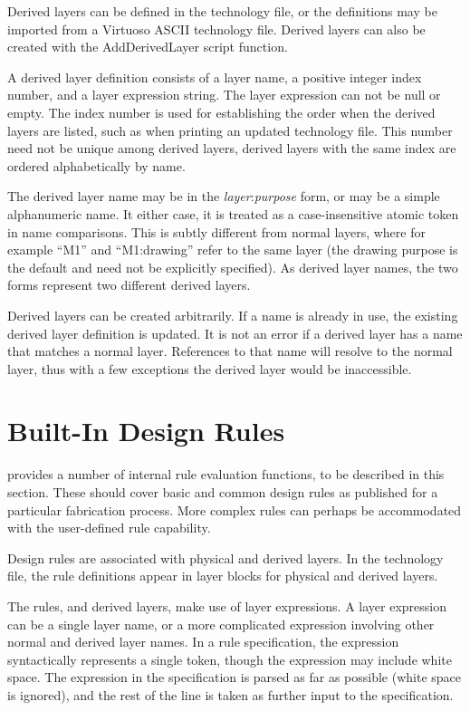 Derived layers can be defined in the technology file, or the
definitions may be imported from a Virtuoso ASCII technology file. 
Derived layers can also be created with the {\vt AddDerivedLayer}
script function.

A derived layer definition consists of a layer name, a positive
integer index number, and a layer expression string.  The layer
expression can not be null or empty.  The index number is used for
establishing the order when the derived layers are listed, such as
when printing an updated technology file.  This number need not be
unique among derived layers, derived layers with the same index are
ordered alphabetically by name.

The derived layer name may be in the {\it layer\/}:{\it purpose} form,
or may be a simple alphanumeric name.  It either case, it is treated
as a case-insensitive atomic token in name comparisons.  This is
subtly different from normal layers, where for example ``{\vt M1}''
and ``{\vt M1:drawing}'' refer to the same {\Xic} layer (the {\vt
drawing} purpose is the default and need not be explicitly specified). 
As derived layer names, the two forms represent two different derived
layers.

Derived layers can be created arbitrarily.  If a name is already in
use, the existing derived layer definition is updated.  It is not an
error if a derived layer has a name that matches a normal layer. 
References to that name will resolve to the normal layer, thus with a
few exceptions the derived layer would be inaccessible.


\section{Built-In Design Rules}
\label{designrules}

{\Xic} provides a number of internal rule evaluation functions, to
be described in this section.  These should cover basic and common
design rules as published for a particular fabrication process.  More
complex rules can perhaps be accommodated with the
user-defined rule capability.

Design rules are associated with {\Xic} physical and derived layers. 
In the technology file, the rule definitions appear in layer blocks
for physical and derived layers.

The rules, and derived layers, make use of layer expressions.  A layer
expression can be a single layer name, or a more complicated
expression involving other normal and derived layer names.  In a rule
specification, the expression syntactically represents a single token,
though the expression may include white space.  The expression in the
specification is parsed as far as possible (white space is ignored),
and the rest of the line is taken as further input to the
specification.

